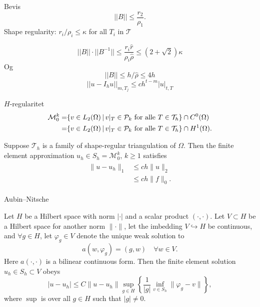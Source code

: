 \begin{frame}{Bevis}
\begin{equation}
    ||B|| \leq \frac{r_2}{\rho_1}.
\end{equation}
    Shape regularity: $r_i / \rho_i \leq \kappa$ for all $T_i$ in $\mathcal{T}$

    $$||B|| \cdot ||B^{-1}|| \leq \frac{r_i \hat{r}}{\rho_i \hat{\rho}} \leq \left( 2 + \sqrt{2} \right)\kappa$$
    Og
    $$||B|| \leq h/\hat{\rho}\leq 4h$$
    \begin{equation}
        ||u-I_h u||_{m,T_j} \leq c h^{t-m} |u|_{t,T}
    \end{equation}
\end{frame}
\fi
\begin{frame}{$H$-regularitet}
\begin{align*}
    \mathcal{M}^k_0 =& \{ v \in L_2(\Omega) \,|\, v|_T \in \mathcal{P}_k \text{ for alle } T \in \mathcal{T}_h \} \cap C^0(\Omega) \\
    =& \{ v \in L_2(\Omega) \,|\, v|_T \in \mathcal{P}_k \text{ for alle } T \in \mathcal{T}_h \} \cap H^1(\Omega) .
\end{align*}
    \begin{theorem}
    Suppose $\mathcal{T}_h$ is a family of shape-regular triangulation of $\Omega$. 
    Then the finite element approximation $u_h\in S_h = \mathcal{M}^k_0$, $k\geq 1$ satisfies
    \begin{align}
        \begin{split}
            \|u-u_h\|_1&\leq ch\|u\|_2\ \\
            &\leq ch\|f\|_0.
        \end{split}
        \label{eq:7.3}
    \end{align}\label{thm:7.3}
    \end{theorem}
\end{frame}

\begin{frame}{Aubin–Nitsche}
    \begin{theorem}
    Let $H$ be a Hilbert space with norm $|\cdot|$ and a scalar product $(\cdot,\cdot)$.
    Let $V\subset H$ be a Hilbert space for another norm $\|\cdot\|$, let the imbedding
    $V \hookrightarrow H$ be continuous,
    and $\forall g \in H$, let $\varphi_g \in V$ denote the unique weak solution to 
    \begin{equation}
        a(w,\varphi_g) = (g,w) \quad \forall w\in V. \label{eq:aubin_nitsche_antagelse}
    \end{equation}
    Here $a(\cdot,\cdot)$ is a bilinear continuous form.
    Then the finite element solution $u_h\in S_h \subset V$ obeys
    \begin{equation*}
        |u-u_h| \leq C \|u-u_h\| \sup_{g\in H} \left \{ \frac{1}{|g|} \inf_{v \in S_h} \|\varphi_g - v\| \right \},
    \end{equation*}
    where $\sup$ is over all $g\in H$ such that $|g|\neq 0$.
    \end{theorem}
\end{frame}

